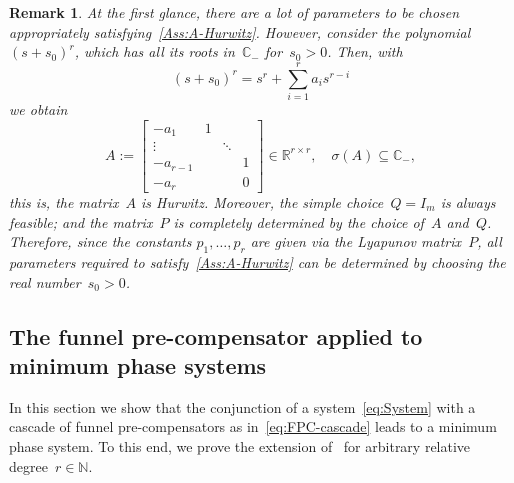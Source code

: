 \documentclass[ envcountsect, envcountsame]{svjour3}
\newtheorem{Remark}[Theorem]{Remark}
\newcommand{\R}{\mathbb{R}}
\newcommand{\C}{\mathbb{C}}
\newcommand{\N}{\mathbb{N}}
\begin{document}
\begin{Remark} \label{Rem:Constants}
At the first glance, there are a lot of parameters to be chosen appropriately satisfying~\ref{Ass:A-Hurwitz}.
However, consider the polynomial $(s+s_0)^r$, which has all its roots in~$\C_-$ for~$s_0 > 0$. Then, with
\begin{equation*}
(s+s_0)^r = s^r + \sum_{i=1}^{r} a_i s^{r-i}
\end{equation*}
we obtain
\begin{equation*}
A := \begin{bmatrix}
-a_1 & 1 & &\\ \vdots & & \ddots &  \\ -a_{r-1} & & & 1 \\ -a_{r} & & &0
\end{bmatrix} \in \R^{r \times r}, \quad \sigma(A) \subseteq \C_-, 
\end{equation*}
this is, the matrix~$A$ is Hurwitz.
Moreover, the simple choice~$Q = I_m$ is always feasible; and the matrix~$P$ is completely determined by the choice of~$A$ and~$Q$.
Therefore, since the constants $p_1,\ldots,p_r$ are given via the Lyapunov matrix~$P$, all parameters required to satisfy~\ref{Ass:A-Hurwitz} 
can be determined by choosing the real number~${s_0 > 0}$.
\end{Remark}


%
\subsection{The funnel pre-compensator applied to minimum phase systems} \label{Sec:FPC}
In this section we show that the conjunction of a system~\eqref{eq:System} with a cascade of funnel pre-compensators as in~\eqref{eq:FPC-cascade} leads to a minimum phase system. 
To this end, we prove the extension of~\cite[Thm. 2]{BergReis18b} for arbitrary relative degree~$r \in \N$.
\end{document}
